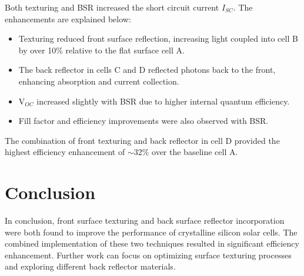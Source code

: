 \documentclass[zh-cn]{report}
\begin{document}
Both texturing and BSR increased the short circuit current $I_{SC}$. The enhancements are explained below:

\begin{itemize}
\item Texturing reduced front surface reflection, increasing light coupled into cell B by over 10\% relative to the flat surface cell A.
\item The back reflector in cells C and D reflected photons back to the front, enhancing absorption and current collection.
\item V$_{OC}$ increased slightly with BSR due to higher internal quantum efficiency.
\item Fill factor and efficiency improvements were also observed with BSR.
\end{itemize}

The combination of front texturing and back reflector in cell D provided the highest efficiency enhancement of $\sim$32\% over the baseline cell A.

\section{Conclusion}
In conclusion, front surface texturing and back surface reflector incorporation were both found to improve the performance of crystalline silicon solar cells. The combined implementation of these two techniques resulted in significant efficiency enhancement. Further work can focus on optimizing surface texturing processes and exploring different back reflector materials.
\end{document}
